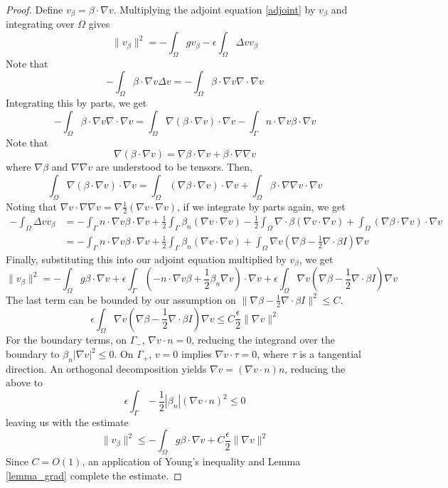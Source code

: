 \documentclass[11pt,onecolumn]{scrartcl}
\newcommand{\del}{\Delta}
\newcommand{\grad}{\nabla}
\renewcommand{\div}{\grad \cdot}
\begin{document}
\begin{proof}
Define $v_\beta = \beta\cdot \grad v$.  Multiplying the adjoint equation \eqref{adjoint} by $v_\beta$ and integrating over $\Omega$ gives
\[
\|v_\beta\|^2 = -\int_\Omega g v_\beta - \epsilon \int_\Omega \Delta v v_\beta
\]
Note that 
\[
-\int_{\Omega} \beta\cdot \grad v \del v = -\int_{\Omega} \beta\cdot \grad v \div \grad v
\]
Integrating this by parts, we get
\[
-\int_{\Omega} \beta\cdot \grad v \div \grad v = \int_{\Omega}\grad (\beta\cdot \grad v) \cdot \grad v  - \int_{\Gamma}n\cdot \grad v \beta\cdot\grad v
\]
Note that 
\[
\grad (\beta \cdot \grad v) = \grad \beta \cdot \grad v + \beta \cdot \grad \grad v
\]
where $\grad \beta$ and $\grad \grad v$ are understood to be tensors. Then, 
\[
\int_{\Omega}\grad (\beta\cdot \grad v) \cdot \grad v = \int_{\Omega}(\grad \beta\cdot \grad v) \cdot \grad v + \int_{\Omega}\beta\cdot \grad\grad v \cdot \grad v 
\]
Noting that $\grad v \cdot \grad \grad v = \grad\frac{1}{2}\left(\grad v\cdot \grad v\right)$, if we integrate by parts again, we get
\begin{align*}
-\int_{\Omega}  \del vv_\beta &= - \int_{\Gamma}n\cdot \grad v \beta\cdot\grad v + \frac{1}{2}\int_{\Gamma}\beta_n (\grad v \cdot \grad v ) - \frac{1}{2}\int_{\Omega}\div \beta (\grad v \cdot \grad v ) + \int_{\Omega}(\grad \beta\cdot \grad v) \cdot \grad v\\
&= - \int_{\Gamma}n\cdot \grad v \beta\cdot\grad v + \frac{1}{2}\int_{\Gamma}\beta_n (\grad v \cdot \grad v ) + \int_{\Omega} \grad v \left(\grad \beta - \frac{1}{2}\div \beta I\right)\grad v
\end{align*}
Finally, substituting this into our adjoint equation multiplied by $v_\beta$, we get
\[
\| v_\beta\|^2 = -\int_{\Omega}g\beta\cdot \grad v +  \epsilon\int_{\Gamma}  \left( -n\cdot \grad v \beta + \frac{1}{2}\beta_n \grad v \right) \cdot \grad v + \epsilon\int_{\Omega} \grad v \left(\grad \beta - \frac{1}{2}\div \beta I\right)\grad v
\]
The last term can be bounded by our assumption on $\|\grad \beta - \frac{1}{2}\div \beta I\|^2 \leq C$.
\[
\epsilon \int_{\Omega} \grad v \left(\grad \beta - \frac{1}{2}\div \beta I\right)\grad v \leq C\frac{\epsilon}{2} \|\grad v\|^2
\]
For the boundary terms, on $\Gamma_-$, $\grad v\cdot n = 0$, reducing the integrand over the boundary to $\beta_n|\grad v|^2 \leq 0$.  On $\Gamma_+$, $v=0$ implies $\grad v \cdot \tau = 0$, where $\tau$ is a tangential direction.  An orthogonal decomposition yields $\grad v = (\grad v \cdot n) n$, reducing the above to 
\[
 \epsilon\int_{\Gamma}  -\frac{1}{2}|\beta_n| (\grad v \cdot n)^2 \leq 0
\]
leaving us with the estimate
\[
\|v_\beta\|^2 \leq  -\int_{\Omega}g\beta\cdot \grad v + C\frac{\epsilon}{2} \|\grad v\|^2
\]
Since $C=O(1)$, an application of Young's inequality and Lemma \ref{lemma_grad} complete the estimate.
\end{proof}
\end{document}
